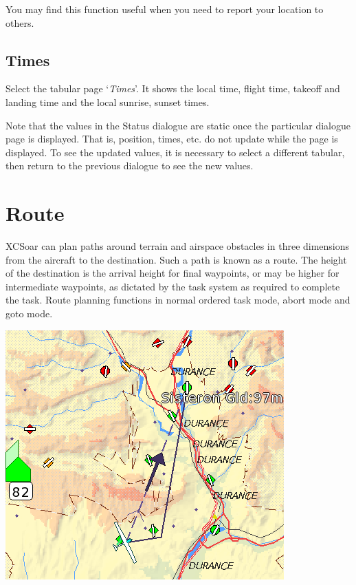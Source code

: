 You may find this function useful when you need to report your
location to others.

\subsection*{Times}\label{sec:time-status}
Select the tabular page `{\it Times}'.
It shows the local time, flight time, takeoff and landing time and
the local sunrise, sunset times.

Note that the values in the Status dialogue
are static once the particular dialogue page is displayed.
That is, position, times, etc. do not update while the page is displayed.
To see the updated values, it is necessary to select a different tabular,
then return to the previous dialogue to see the new values.


\section{Route}\label{sec:route}

XCSoar can plan paths around terrain and airspace obstacles in three
dimensions from the aircraft to the destination.  Such a path is known
as a route.  The height of the destination is the arrival height for
final waypoints, or may be higher for intermediate waypoints, as
dictated by the task system as required to complete the task.  Route
planning functions in normal ordered task mode, abort mode and goto
mode.

\begin{center}
\includegraphics[angle=0,width=0.8\linewidth,keepaspectratio='true']{figures/route3.png}
\end{center}

